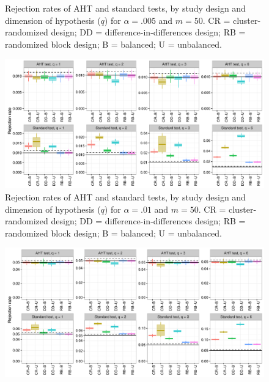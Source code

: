\documentclass{article}\usepackage[]{graphicx}\usepackage[]{color}
\newenvironment{knitrout}{}{} %
\begin{document}
\begin{landscape}
\begin{knitrout}
\begin{figure}[H]
{}

\caption[Rejection rates of AHT and standard tests, by study design and dimension of hypothesis (]{Rejection rates of AHT and standard tests, by study design and dimension of hypothesis ($q$) for $\alpha = .005$ and $m = 50$. CR = cluster-randomized design; DD = difference-in-differences design; RB = randomized block design; B = balanced; U = unbalanced.}\label{fig:balance_005_50}
\end{figure}


\end{knitrout}

\begin{knitrout}
\color{fgcolor}\begin{figure}[H]

{\centering \includegraphics[width=\linewidth]{CR_fig/balance_01_50-1} 

}

\caption[Rejection rates of AHT and standard tests, by study design and dimension of hypothesis (]{Rejection rates of AHT and standard tests, by study design and dimension of hypothesis ($q$) for $\alpha = .01$ and $m = 50$. CR = cluster-randomized design; DD = difference-in-differences design; RB = randomized block design; B = balanced; U = unbalanced.}\label{fig:balance_01_50}
\end{figure}


\end{knitrout}

\begin{knitrout}
\color{fgcolor}\begin{figure}[H]

{\centering \includegraphics[width=\linewidth]{CR_fig/balance_05_50-1} 

}
\end{figure}
\end{knitrout}
\end{landscape}
\end{document}

